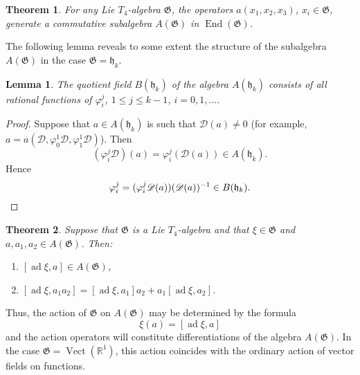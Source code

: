 \documentclass[a4paper]{article}
\newtheorem{theorem}{Theorem}
\newtheorem{lemma}{Lemma}
\newcommand{\R}{\mathbb{R}}
\newcommand{\ad}{\operatorname{ad}}
\newcommand{\End}{\operatorname{End}}
\newcommand{\Vect}{\operatorname{Vect}}
\begin{document}
\begin{theorem}
	\label{thm:1}
	For any Lie $T_4$-algebra $\mathfrak{G}$, the operators $a(x_1,x_2,x_3)$, $x_i \in \mathfrak{G}$, generate a commutative subalgebra $A(\mathfrak{G})$ in $\End(\mathfrak{G})$.
\end{theorem}

The following lemma reveals to some extent the structure of the subalgebra $A(\mathfrak{G})$ in the case $\mathfrak{G} = \mathfrak{h}_k$.

\begin{lemma}
	\label{lem:1}
	The quotient field $B(\mathfrak{h}_k)$ of the algebra $A(\mathfrak{h}_k)$ consists of all rational functions of $\varphi_i^j$, $1 \leq j \leq k-1$, $i = 0, 1, \dotsc$.
\end{lemma}

\begin{proof}
	Suppose that $a \in A(\mathfrak{h}_k)$ is such that $\mathscr{D}(a) \neq 0$ (for example, $a = a(\mathscr{D},\varphi_0^1\mathscr{D},\varphi_1^1\mathscr{D})$).
	Then 
	\begin{equation*}
		(\varphi_i^j \mathscr{D})(a) = \varphi_i^j (\mathscr{D}(a)) \in A(\mathfrak{h}_k).
	\end{equation*}
	Hence
	\begin{equation*}
		\varphi_i^j = (\varphi_i^j \mathscr{D}(a)) (\mathscr{D}(a))^{-1} \in B(\mathfrak{h}_k).
		\qedhere
	\end{equation*}
\end{proof}

\begin{theorem}
	\label{thm:2}
	Suppose that $\mathfrak{G}$ is a Lie $T_4$-algebra and that $\xi \in \mathfrak{G}$ and $a, a_1, a_2 \in A(\mathfrak{G})$.
	Then:
	\begin{enumerate}
		\item \label{it:1} $[\ad \xi, a] \in A(\mathfrak{G})$,
		\item \label{it:2} $[\ad \xi, a_1 a_2] = [\ad \xi, a_1] a_2 + a_1[\ad \xi, a_2]$.
	\end{enumerate}
\end{theorem}

Thus, the action of $\mathfrak{G}$ on $A(\mathfrak{G})$ may be determined by the formula
\begin{equation}
	\label{eq:4}
	\xi(a) = [\ad \xi, a]
\end{equation}
and the action operators will constitute differentiations of the algebra $A(\mathfrak{G})$.
In the case $\mathfrak{G} = \Vect (\R^1)$, this action coincides with the ordinary action of vector fields on functions.
\end{document}
